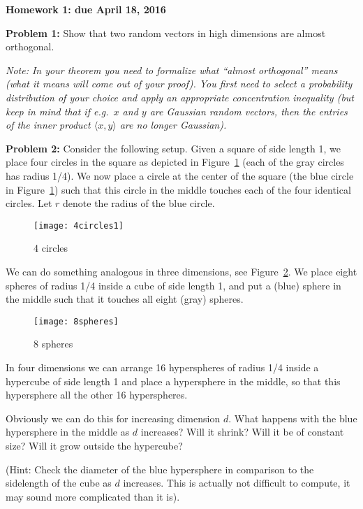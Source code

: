 \documentclass[12pt]{article}
\begin{document}
\centerline{\large \bf Homework 1: due April 18, 2016}
\bigskip

\bigskip
\noindent
{\bf Problem 1:} 
Show that two random vectors in high dimensions are almost orthogonal.

{\em Note: In your theorem you need to formalize what ``almost orthogonal'' means (what it means will come
out of your proof). You first need to select a probability distribution of your choice and apply
an appropriate concentration inequality (but keep in mind that if e.g.\ $x$ and $y$ are Gaussian random
vectors, then the entries of the inner product $\langle x, y \rangle$ are no longer Gaussian).}

\bigskip
\noindent
{\bf Problem 2:} Consider the following setup. Given a square of side length 1, we place four circles
in the square as depicted in Figure~\ref{fig1} (each of the gray circles has radius 1/4). We now place a circle
at the center of the square (the blue circle in Figure~\ref{fig1}) such that this circle in the middle touches each of 
the four identical circles. Let $r$ denote the radius of the blue circle. 

\begin{figure}[ht!]
\begin{center}
\texttt{[image: 4circles1]}
\caption{4 circles}
\label{fig1}
\end{center}
\end{figure}

We can do something analogous in three dimensions, see Figure~\ref{fig2}. We place eight spheres of 
radius 1/4 inside a cube of side length 1, and put a (blue) sphere in the middle such that it touches
all eight (gray) spheres.

\begin{figure}[ht!]
\begin{center}
\texttt{[image: 8spheres]}
\caption{8 spheres}
\label{fig2}
\end{center}
\end{figure}

In four dimensions we can arrange 16 hyperspheres of radius 1/4 inside a hypercube of side length 1 and place a
hypersphere in the middle, so that this hypersphere all the other 16 hyperspheres.

Obviously we can do this for increasing dimension $d$. What happens with the blue hypersphere in the middle as
$d$ increases?
Will it shrink? Will it be of constant size? Will it grow outside the hypercube?

(Hint: Check the diameter of the blue hypersphere in comparison to the sidelength of the cube as $d$ increases. 
This is actually not difficult to compute, it may sound more complicated than it is).
\end{document}
